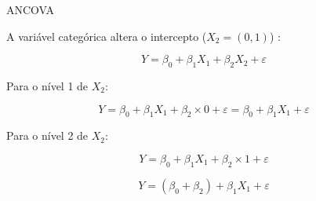 \documentclass{beamer}\usepackage[]{graphicx}\usepackage[]{color}
\begin{document}
\begin{frame}{ANCOVA}

\begin{small}

A variável categórica altera o intercepto ($X_2 =(0,1)$)  :

\begin{equation*}
Y = \beta _0 + \beta _1 X_1 + \beta _2 X_2 + \varepsilon
\end{equation*}

Para o nível 1 de $X_2$:

\begin{equation*}
Y = \beta _0 + \beta _1 X_1 + \beta _2 \times 0 + \varepsilon = \beta _0 + \beta _1 X_1 + \varepsilon
\end{equation*}

Para o nível 2 de $X_2$:

\begin{equation*}
Y = \beta _0 + \beta _1 X_1 + \beta _2 \times 1 + \varepsilon
\end{equation*}

\begin{equation*}
Y = (\beta _0 + \beta _2) +  \beta _1 X_1 + \varepsilon
\end{equation*}

\end{small}

\end{frame}
\end{document}
